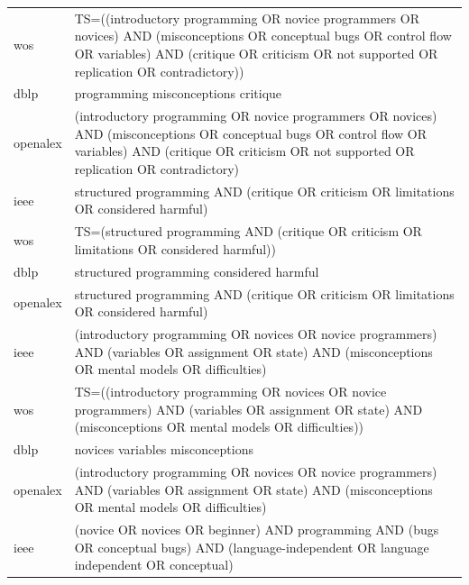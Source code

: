 \documentclass{article}
\begin{document}
\begin{longtable}{lp{10cm}}
wos & TS=((\textquotedbl{}introductory programming\textquotedbl{} OR \textquotedbl{}novice programmers\textquotedbl{} OR novices) AND (misconceptions OR \textquotedbl{}conceptual bugs\textquotedbl{} OR \textquotedbl{}control flow\textquotedbl{} OR variables) AND (critique OR criticism OR \textquotedbl{}not supported\textquotedbl{} OR replication OR contradictory)) \\
dblp & programming misconceptions critique \\
openalex & (\textquotedbl{}introductory programming\textquotedbl{} OR \textquotedbl{}novice programmers\textquotedbl{} OR novices) AND (misconceptions OR \textquotedbl{}conceptual bugs\textquotedbl{} OR \textquotedbl{}control flow\textquotedbl{} OR variables) AND (critique OR criticism OR \textquotedbl{}not supported\textquotedbl{} OR replication OR contradictory) \\
ieee & \textquotedbl{}structured programming\textquotedbl{} AND (critique OR criticism OR limitations OR \textquotedbl{}considered harmful\textquotedbl{}) \\
wos & TS=(\textquotedbl{}structured programming\textquotedbl{} AND (critique OR criticism OR limitations OR \textquotedbl{}considered harmful\textquotedbl{})) \\
dblp & structured programming considered harmful \\
openalex & \textquotedbl{}structured programming\textquotedbl{} AND (critique OR criticism OR limitations OR \textquotedbl{}considered harmful\textquotedbl{}) \\
ieee & (\textquotedbl{}introductory programming\textquotedbl{} OR novices OR \textquotedbl{}novice programmers\textquotedbl{}) AND (variables OR assignment OR state) AND (misconceptions OR \textquotedbl{}mental models\textquotedbl{} OR difficulties) \\
wos & TS=((\textquotedbl{}introductory programming\textquotedbl{} OR novices OR \textquotedbl{}novice programmers\textquotedbl{}) AND (variables OR assignment OR state) AND (misconceptions OR \textquotedbl{}mental models\textquotedbl{} OR difficulties)) \\
dblp & novices variables misconceptions \\
openalex & (\textquotedbl{}introductory programming\textquotedbl{} OR novices OR \textquotedbl{}novice programmers\textquotedbl{}) AND (variables OR assignment OR state) AND (misconceptions OR \textquotedbl{}mental models\textquotedbl{} OR difficulties) \\
ieee & (novice OR novices OR beginner) AND programming AND (bugs OR \textquotedbl{}conceptual bugs\textquotedbl{}) AND (\textquotedbl{}language-independent\textquotedbl{} OR \textquotedbl{}language independent\textquotedbl{} OR conceptual) \\

\end{longtable}
\end{document}
